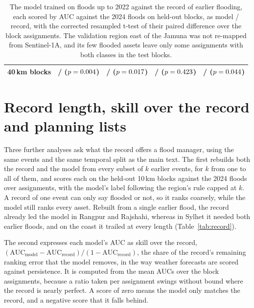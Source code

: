 \documentclass[11pt]{article}
\begin{document}
\begin{table}[tp]
{\begin{tabular}{lllll}
40\,km blocks & \RRBlockFortyModelAUC{} / \RRBlockFortyRecordAUC{} ($p=0.004{}$) & \SylhetBlockFortyModelAUC{} / \SylhetBlockFortyRecordAUC{} ($p=0.017{}$) & \CoastalBlockFortyModelAUC{} / \CoastalBlockFortyRecordAUC{} ($p=0.423{}$) & \JamunaBlockFortyModelAUC{} / \JamunaBlockFortyRecordAUC{} ($p=0.044{}$) \\
\bottomrule
\end{tabular}}
\caption{The model trained on floods up to 2022 against the record of earlier flooding, each scored by AUC against the 2024 floods on held-out blocks, as model / record, with the corrected resampled t-test of their paired difference over the block assignments. The validation region east of the Jamuna was not re-mapped from Sentinel-1A, and its few flooded assets leave only some assignments with both classes in the test blocks.}
\label{tab:robust}
\end{table}


\section{Record length, skill over the record and planning lists}
\label{si:record}

Three further analyses ask what the record offers a flood manager, using the same events and the same temporal split as the main text. The first rebuilds both the record and the model from every subset of $k$ earlier events, for $k$ from one to all of them, and scores each on the held-out 10\,km blocks against the 2024 floods over \RRBenchSeeds{} assignments, with the model's label following the region's rule capped at $k$. A record of one event can only say flooded or not, so it ranks coarsely, while the model still ranks every asset. Rebuilt from a single earlier flood, the record already led the model in Rangpur and Rajshahi, whereas in Sylhet it needed both earlier floods, and on the coast it trailed at every length (Table~\ref{tab:record}).

The second expresses each model's AUC as skill over the record, $(\mathrm{AUC}_{\mathrm{model}}-\mathrm{AUC}_{\mathrm{record}})/(1-\mathrm{AUC}_{\mathrm{record}})$, the share of the record's remaining ranking error that the model removes, in the way weather forecasts are scored against persistence. It is computed from the mean AUCs over the block assignments, because a ratio taken per assignment swings without bound where the record is nearly perfect. A score of zero means the model only matches the record, and a negative score that it falls behind.
\end{document}
